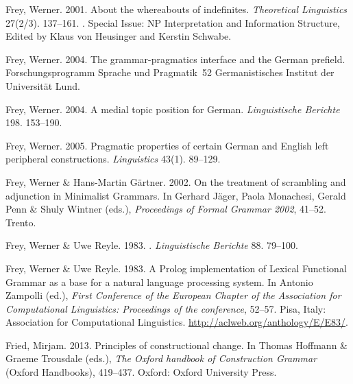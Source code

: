 \begin{thebibliography}{1420}
Frey, Werner. 2001.
\newblock About the whereabouts of indefinites.
\newblock \emph{Theoretical Linguistics} 27(2/3). 137--161.
\newblock {}.
\newblock Special Issue: {NP} Interpretation and Information Structure, Edited
  by {Klaus von Heusinger} and {Kerstin Schwabe}.

Frey, Werner. 2004{}.
\newblock The grammar-pragmatics interface and the {German} prefield.
\newblock Forschungsprogramm Sprache und Pragmatik~52 Germanistisches Institut
  der Universit{\"a}t Lund.

Frey, Werner. 2004{}.
\newblock A medial topic position for {German}.
\newblock \emph{Linguistische Berichte} 198. 153--190.

Frey, Werner. 2005.
\newblock Pragmatic properties of certain {German} and {English} left
  peripheral constructions.
\newblock \emph{Linguistics} 43(1). 89--129.

Frey, Werner \& Hans-Martin G{\"a}rtner. 2002.
\newblock On the treatment of scrambling and adjunction in {Minimalist
  Grammars}.
\newblock In Gerhard J{\"a}ger, Paola Monachesi, Gerald Penn \& Shuly Wintner
  (eds.), \emph{Proceedings of {Formal Grammar 2002}}, 41--52. Trento.

Frey, Werner \& Uwe Reyle. 1983{}.
.
\newblock \emph{Linguistische Berichte} 88. 79--100.

Frey, Werner \& Uwe Reyle. 1983{}.
\newblock A {Prolog} implementation of {Lexical Functional Grammar} as a base
  for a natural language processing system.
\newblock In Antonio Zampolli (ed.), \emph{{First Conference of the European
  Chapter of the Association for Computational Linguistics}: {Proceedings} of
  the conference}, 52--57. Pisa, Italy: Association for Computational
  Linguistics.
\newblock \urlprefix\url{http://aclweb.org/anthology/E/E83/}.

Fried, Mirjam. 2013.
\newblock Principles of constructional change.
\newblock In Thomas Hoffmann \& Graeme Trousdale (eds.), \emph{The {Oxford}
  handbook of {Construction Grammar}}  (Oxford Handbooks), 419--437. Oxford:
  Oxford University Press.


\end{thebibliography}

